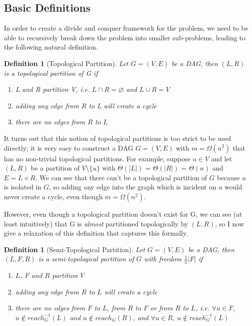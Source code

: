 \documentclass{report}
\newtheorem{definition}[theorem]{Definition}
\begin{document}
\subsection{Basic Definitions}

In order to create a divide and conquer framework for the problem, we need to be able to recursively break down the problem into smaller sub-problems, leading to the following natural definition.

\begin{definition}[Topological Partition]
Let $G=(V,E)$ be a DAG, then $(L,R)$ is a \textit{topological partition} of G if
\begin{enumerate}
\item L and R partition V, i.e. $L \cap R = \varnothing$ and $L \cup R = V$
\item adding any edge from R to L will create a cycle
\item there are no edges from $R$ to $L$
\end{enumerate}
\end{definition}

It turns out that this notion of topological partitions is too strict to be used directly; it is very easy to construct a DAG $G=(V,E)$ with $m=\Omega (n^{2})$ that has no non-trivial topological partitions. For example, suppose $u \in V$ and let $(L,R)$ be a partition of $V\setminus{\{u\}}$ with $\Theta(\vert L \vert)$ = $\Theta(\vert R \vert)$ = $\Theta(n)$ and $E = L \times R$. We can see that there can't be a topological partition of $G$ because $u$ is isolated in $G$, so adding any edge into the graph which is incident on $u$ would never create a cycle, even though $m=\Omega (n^{2})$.

However, even though a topological partition doesn't exist for G, we can see (at least intuitively) that G is \textit{almost} partitioned topologically by $(L,R)$, so I now give a relaxation of this definition that captures this formally.

\begin{definition}[Semi-Topological Partition]
Let $G=(V,E)$ be a DAG, then $(L,F,R)$ is a \textit{semi-topological partition} of $G$ with \textit{freedom} $\frac{1}{n} \vert F \vert$ if
\begin{enumerate}
\item $L$, $F$ and $R$ partition $V$
\item adding any edge from $R$ to $L$ will create a cycle
\item there are no edges from $F$ to $L$, from $R$ to $F$ or from $R$ to $L$, i.e. $\forall u \in F$, $u \notin reach_{G}^{-1}(L)$ and $u \notin reach_{G}(R)$, and $\forall u \in R$, $u \notin reach_{G}^{-1}(L)$ 
\end{enumerate}
\end{definition}
\end{document}
